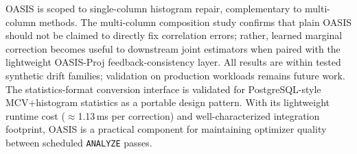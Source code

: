 \documentclass[runningheads]{llncs}
\begin{document}
OASIS is scoped to single-column histogram repair, complementary to multi-column methods. The multi-column composition study confirms that plain OASIS should not be claimed to directly fix correlation errors; rather, learned marginal correction becomes useful to downstream joint estimators when paired with the lightweight OASIS-Proj feedback-consistency layer. All results are within tested synthetic drift families; validation on production workloads remains future work. The statistics-format conversion interface is validated for PostgreSQL-style MCV+histogram statistics as a portable design pattern. With its lightweight runtime cost ($\approx$1.13\,ms per correction) and well-characterized integration footprint, OASIS is a practical component for maintaining optimizer quality between scheduled \texttt{ANALYZE} passes.



\end{document}
